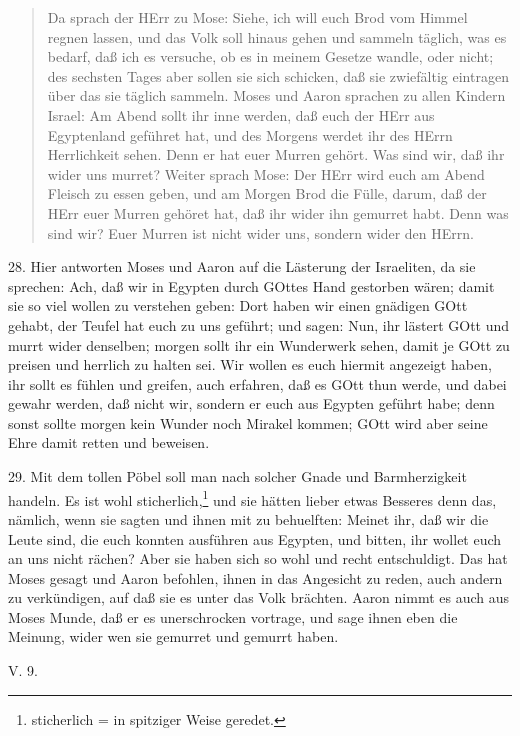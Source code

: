 \begin{quote}
Da sprach der HErr zu Mose: Siehe, ich will euch Brod vom Himmel regnen lassen, und das Volk soll hinaus gehen und sammeln täglich, was es bedarf, daß ich es versuche, ob es in meinem Gesetze wandle, oder nicht; des sechsten Tages aber sollen sie sich schicken, daß sie zwiefältig eintragen über das sie täglich sammeln. Moses und Aaron sprachen zu allen Kindern Israel: Am Abend sollt ihr inne werden, daß euch der HErr aus Egyptenland geführet hat, und des Morgens werdet ihr des HErrn Herrlichkeit sehen. Denn er hat euer Murren gehört. Was sind wir, daß ihr wider uns murret? Weiter sprach Mose: Der HErr wird euch am Abend Fleisch zu essen geben, und am Morgen Brod die Fülle, darum, daß der HErr euer Murren gehöret hat, daß ihr wider ihn gemurret habt. Denn was sind wir? Euer Murren ist nicht wider uns, sondern wider den HErrn.
\end{quote}

28. Hier antworten Moses und Aaron auf die Lästerung der Israeliten, da sie sprechen: Ach, daß wir in Egypten durch GOttes Hand gestorben wären; damit sie so viel wollen zu verstehen geben: Dort haben wir einen gnädigen GOtt gehabt, der Teufel hat euch zu uns geführt; und sagen: Nun, ihr lästert GOtt und murrt wider denselben; morgen sollt ihr ein Wunderwerk sehen, damit je GOtt zu preisen und herrlich zu halten sei. Wir wollen es euch hiermit angezeigt haben, ihr sollt es fühlen und greifen, auch erfahren, daß es GOtt thun werde, und dabei gewahr werden, daß nicht wir, sondern er euch aus Egypten geführt habe; denn sonst sollte morgen kein Wunder noch Mirakel kommen; GOtt wird aber seine Ehre damit retten und beweisen.

29. Mit dem tollen Pöbel soll man nach solcher Gnade und Barmherzigkeit handeln. Es ist wohl sticherlich,\footnote{sticherlich = in spitziger Weise geredet.} und sie hätten lieber etwas Besseres denn das, nämlich, wenn sie sagten und ihnen mit zu behuelften: Meinet ihr, daß wir die Leute sind, die euch konnten ausführen aus Egypten, und bitten, ihr wollet euch an uns nicht rächen? Aber sie haben sich so wohl und recht entschuldigt. Das hat Moses gesagt und Aaron befohlen, ihnen in das Angesicht zu reden, auch andern zu verkündigen, auf daß sie es unter das Volk brächten. Aaron nimmt es auch aus Moses Munde, daß er es unerschrocken vortrage, und sage ihnen eben die Meinung, wider wen sie gemurret und gemurrt haben.

\begin{schriftzitat}
V. 9.
\end{schriftzitat}

